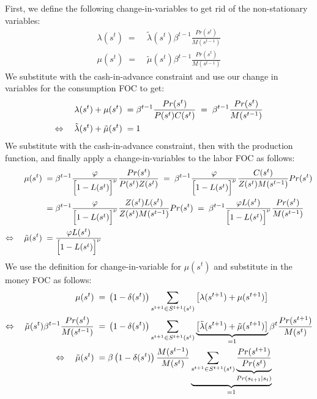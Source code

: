 \documentclass[a4paper, 12pt]{article}
\begin{document}
\begin{Answer}%
	First, we define the following change-in-variables to get rid of the non-stationary variables:%
	\begin{align}%
		\lambda(s^t) \; = & \; \tilde{\lambda}(s^t) \beta^{t-1} \frac{Pr(s^t)}{M(s^{t-1})}\\%
		\mu(s^t) \; = & \; \tilde{\mu}(s^t) \beta^{t-1} \frac{Pr(s^t)}{M(s^{t-1})}%
	\end{align}%
	We substitute with the cash-in-advance constraint and use our change in variables for the consumption FOC to get:%
	\begin{align}%
		\lambda(s^t) + \mu(s^t) \; = & \; \beta^{t-1} \frac{Pr(s^t)}{P(s^t) C(s^t)} \; = \; \beta^{t-1} \frac{Pr(s^t)}{M(s^{t-1})}\notag\\%
		\Leftrightarrow \quad \tilde{\lambda}(s^t) + \tilde{\mu}(s^t) \; = & \; 1%
	\end{align}%
	We substitute with the cash-in-advance constraint, then with the production function, and finally apply a change-in-variables to the labor FOC as follows:%
	\begin{align}%
		\mu(s^t) \; = & \; \beta^{t-1} \frac{\varphi}{\Bigl[1-L(s^t)\Bigr]^\nu} \frac{Pr(s^t)}{P(s^t)Z(s^t)} \; = \; \beta^{t-1} \frac{\varphi}{\Bigl[1-L(s^t)\Bigr]^\nu} \frac{C(s^t)}{Z(s^t) M(s^{t-1})} Pr(s^t)\notag\\
		= & \; \beta^{t-1} \frac{\varphi}{\Bigl[1-L(s^t)\Bigr]^\nu} \frac{Z(s^t) L(s^t)}{Z(s^t) M(s^{t-1})} Pr(s^t) \; = \; \beta^{t-1} \frac{\varphi L(s^t)}{\Bigl[1-L(s^t)\Bigr]^\nu} \frac{Pr(s^t)}{M(s^{t-1})}\notag\\%
		\Leftrightarrow \quad \tilde{\mu}(s^t) \; = & \; \frac{\varphi L(s^t)}{\Bigl[1-L(s^t)\Bigr]^\nu}%
	\end{align}%
	We use the definition for change-in-variable for $\mu(s^t)$ and substitute in the money FOC as follows:%
	\begin{align}%
		\mu(s^t) \; = & \; \left(1-\delta(s^t)\right) \sum_{s^{t+1}\in S^{t+1}(s^t)} \left[\lambda(s^{t+1}) + \mu(s^{t+1})\right]\notag\\%
		\Leftrightarrow \quad \tilde{\mu}(s^t) \beta^{t-1} \frac{Pr(s^t)}{M(s^{t-1})} \; = & \; \left(1-\delta(s^t)\right) \sum_{s^{t+1}\in S^{t+1}(s^t)} \underbrace{\left[\tilde{\lambda}(s^{t+1}) + \tilde{\mu}(s^{t+1})\right]}_{=1} \beta^t \frac{Pr(s^{t+1})}{M(s^t)}\notag\\%
		\Leftrightarrow \quad \tilde{\mu}(s^t) \; = & \; \beta \left(1-\delta(s^t)\right) \frac{M(s^{t-1})}{M(s^t)} \underbrace{\sum_{s^{t+1}\in S^{t+1}(s^t)} \underbrace{\frac{Pr(s^{t+1})}{Pr(s^t)}}_{Pr(s_{t+1}|s_t)}}_{=1}\notag\\%

\end{align}
\end{Answer}
\end{document}
